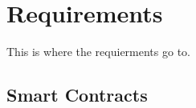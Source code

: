 %
%
\chapter{Requirements}\label{chap:requirements}

This is where the requierments go to.

\section{Smart Contracts}\label{sec:smart-contracts}

